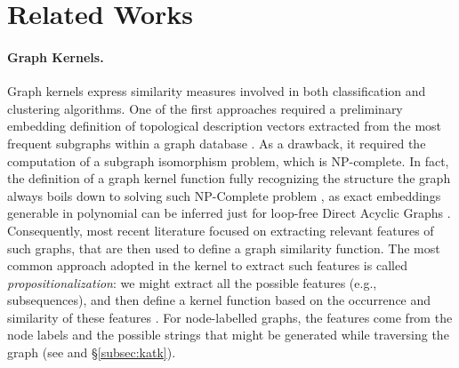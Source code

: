 \section{Related Works}

\paragraph*{Graph Kernels.} Graph kernels express similarity measures \cite{Samatova} involved in both classification \cite{TsudaS10} and clustering algorithms. One of the first approaches required a preliminary embedding definition of topological description vectors extracted from the most frequent subgraphs within a graph database \cite{Sidere}. As a drawback, it required the computation of a subgraph isomorphism problem, which is NP-complete. In fact, the definition of a graph kernel function fully recognizing the structure the graph always boils down to solving such NP-Complete problem \cite{GartnerFW03}, as exact embeddings generable in polynomial can be inferred just for loop-free Direct Acyclic Graphs \cite{BergamiBM20}. Consequently, most recent literature focused on extracting relevant features of such graphs, that are then used to define a graph similarity function. The most common approach adopted in the kernel to extract such features is called \textit{propositionalization}: we might extract all the possible features (e.g., subsequences), and then define a kernel function based on the occurrence and similarity of these features \cite{Gartner03}. For node-labelled graphs, the features come from the node labels and the possible strings that might be generated while traversing the graph (see \cite{Gartner03} and \S\ref{subsec:katk}). 